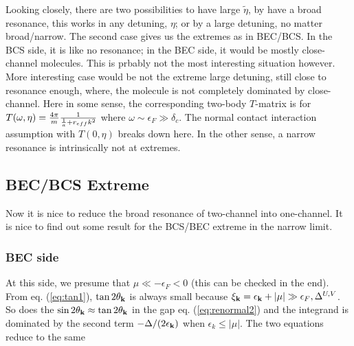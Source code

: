 Looking closely, there are two possibilities to have large $\tilde\eta$, by have a broad resonance, this works in any detuning, $\eta$; or by a large detuning, no matter broad/narrow.    The second case gives us the extremes as in BEC/BCS.  In the BCS side, it is like no resonance; in the BEC side, it would be mostly close-channel molecules.  This is prbably not the most interesting situation however.  More interesting case would be not the extreme large detuning, still close to resonance enough, where, the molecule is not completely dominated by close-channel.  Here in some sense, the corresponding two-body $T$-matrix is for $T(\omega,\eta)=\frac{4\pi}{m}\frac{1}{\frac{1}{a}+r_{eff}k^2}$ where $\omega\sim{}\epsilon_F\gg\delta_c$. The normal contact interaction assumption with $T(0,\eta)$ breaks down here.  In the other sense, a narrow resonance is intrinsically not at extremes. 


\subsection{BEC/BCS Extreme}
Now it is nice to reduce the broad resonance of two-channel into one-channel.  It is nice to find out some result for the BCS/BEC extreme in the narrow limit. 
\subsubsection{BEC side}
At this side, we presume that $\mu\ll-\epsilon_F<0$ (this can be checked in the end). From eq. (\ref{eq:tan1}), $\tan2\theta_{\mathbf{k}}$ is always small because $\xi_{\mathbf{k}}=\epsilon_{\mathbf{k}}+|\mu|\gg\epsilon_F,\Delta^{U,V}$.  So does the $\sin2\theta_{\mathbf{k}}\approx\tan2\theta_{\mathbf{k}}$ in the gap eq. (\ref{eq:renormal2}) and the integrand is dominated by the second term $-\Delta/(2\epsilon_{\mathbf{k}})$ when $\epsilon_k\leq|\mu|$.  The two equations reduce to the same   
